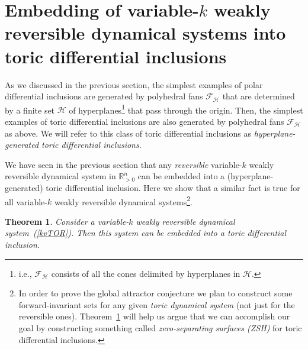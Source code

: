 \documentclass[12pt,letterpaper]{article}
\newtheorem{thm}{Theorem}[section]
\renewcommand{\H}{\mathcal{H}}
\newcommand{\F}{\mathcal{F}}
\newcommand{\RR}{\mathbb{R}}
\begin{document}
\section{Embedding of variable-$k$  weakly reversible dynamical systems into toric differential inclusions} 
\label{section:embedding_WR_in_TDI}

As we discussed in the previous section, the simplest examples of polar differential inclusions are generated by polyhedral fans $\F_\H$ that are determined by a finite set $\H$ of hyperplanes\footnote{
i.e., $\F_\H$ consists of all the cones delimited by hyperplanes in $\H$.
} that pass through the origin. 
Then, the simplest examples of toric differential inclusions are also generated by polyhedral fans $\F_\H$ as above. We will refer to this class of toric differential inclusions as {\em hyperplane-generated toric differential inclusions}. 

We have seen in the previous section that any {\em reversible} variable-$k$  weakly reversible dynamical system in $\RR^n_{>0}$ can be embedded into a (hyperplane-generated) toric differential inclusion. 
Here we show that a similar fact is true for all variable-$k$  weakly reversible dynamical systems\footnote{
In order to prove the global attractor conjecture we plan to construct some forward-invariant sets for  any given {\em toric dynamical system} (not just for the reversible ones). Theorem~\ref{thm_tor_TOR} will help us argue that we can accomplish our goal by constructing something called {\em zero-separating surfaces (ZSH)} for toric differential inclusions. 
}.

\begin{thm}
\label{thm_tor_TOR}
Consider a variable-$k$  weakly reversible dynamical system~{\rm (\ref{kvTOR})}. Then this system can be embedded into a toric differential inclusion.
\end{thm}
\end{document}
